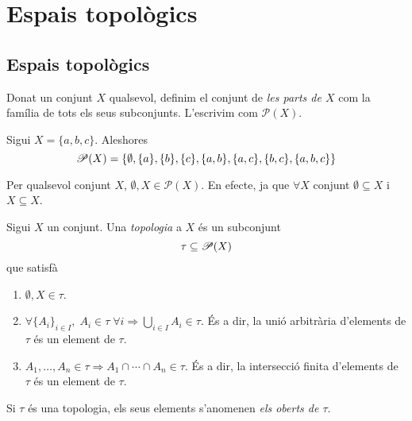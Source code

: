\documentclass[../main.tex]{subfiles}
\begin{document}
\chapter{Espais topològics}







\section{Espais topològics}
\begin{defi}
\label{def:conjuntdelesparts} Donat un conjunt $X$ qualsevol, definim el conjunt de \textit{les parts de $X$} com la família de tots els seus subconjunts. L'escrivim com $\mathscr{P}(X)$.
\end{defi}

\begin{ej}
Sigui $X = \{a,b,c\}$. Aleshores
\begin{equation}
    \notag
    \mathscr{P}(X) = \{\emptyset,\{a\},\{b\},\{c\},\{a,b\},\{a,c\},\{b,c\},\{a,b,c\}\}
\end{equation}
\end{ej}

\begin{nota}
Per qualsevol conjunt $X$, $\emptyset,X\in \mathscr{P}(X)$. En efecte, ja que $\forall X$ conjunt $\emptyset \subseteq X$ i $X\subseteq X$.
\end{nota}

\begin{defi}
[Topologia]\label{def:topologia} Sigui $X$ un conjunt. Una \textit{topologia} a $X$ és un subconjunt
\begin{equation}
    \notag
    \tau\subseteq \mathscr{P}(X)
\end{equation}
que satisfà
\begin{enumerate}[(1)]
    \item $\emptyset,X\in \tau$.
    \item $\forall\{A_i\}_{i\in I},\;A_i\in \tau\;\forall i\Rightarrow \bigcup_{i\in I}A_i\in \tau$. És a dir, la unió arbitrària d'elements de $\tau$ és un element de $\tau$.
    \item $A_1,\ldots,A_n\in\tau\Rightarrow A_1\cap\cdots\cap A_n\in \tau$. És a dir, la intersecció finita d'elements de $\tau$ és un element de $\tau$.
\end{enumerate}
 Si $\tau$ és una topologia, els seus elements s'anomenen \textit{els oberts de $\tau$}. 
\end{defi}
\end{document}
